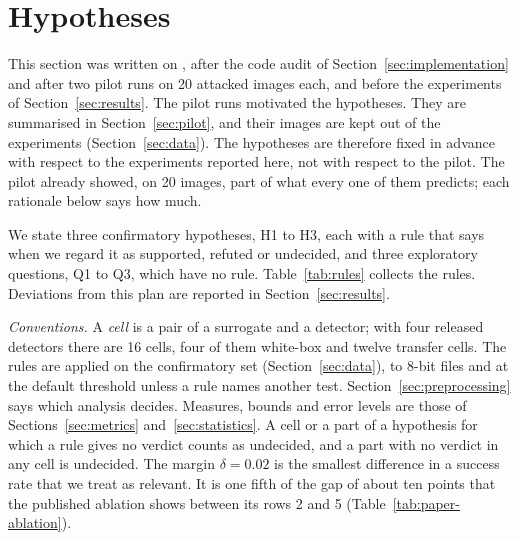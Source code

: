 \section{Hypotheses}
\label{sec:hypotheses}

This section was written on \draftdate, after the code audit of Section~\ref{sec:implementation}
and after two pilot runs on 20 attacked images each, and before the experiments of
Section~\ref{sec:results}. The pilot runs motivated the hypotheses. They are summarised in
Section~\ref{sec:pilot}, and their images are kept out of the experiments
(Section~\ref{sec:data}). The hypotheses are therefore fixed in advance with respect to the
experiments reported here, not with respect to the pilot. The pilot already showed, on 20 images,
part of what every one of them predicts; each rationale below says how much.

We state three confirmatory hypotheses, H1 to H3, each with a rule that says when we regard it as
supported, refuted or undecided, and three exploratory questions, Q1 to Q3, which have no rule.
Table~\ref{tab:rules} collects the rules. Deviations from this plan are reported in
Section~\ref{sec:results}.

\emph{Conventions.} A \emph{cell} is a pair of a surrogate and a detector; with four released
detectors there are 16 cells, four of them white-box and twelve transfer cells. The rules are
applied on the confirmatory set (Section~\ref{sec:data}), to 8-bit files and at the default
threshold unless a rule names another test. Section~\ref{sec:preprocessing} says which analysis
decides. Measures, bounds and error levels are those of Sections~\ref{sec:metrics}
and~\ref{sec:statistics}. A cell or a part of a hypothesis for which a rule gives no verdict
counts as undecided, and a part with no verdict in any cell is undecided. The margin $\delta=0.02$
is the smallest difference in a success rate that we treat as relevant. It is one fifth of the gap
of about ten points that the published ablation shows between its rows 2 and 5
(Table~\ref{tab:paper-ablation}).

